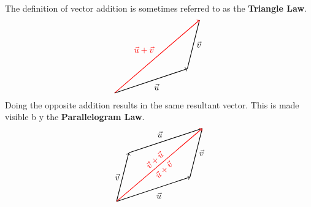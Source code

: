 \documentclass[../Calculus_\Roman{3}]{subfiles}
\begin{document}
				The definition of vector addition is sometimes referred to as the \textbf{Triangle Law}.
				\[\begin{tikzpicture}
					\draw[thick, ->] (0, 0) -- node[anchor = north west]{$\vec{u}$} ++ (3, 1);
					\draw[thick] (3, 1) -- node[anchor = west]{$\vec{v}$} ++ (0.5, 2);
					\draw[thick, ->, color = red] (0, 0) -- node[anchor = south east]{$\vec{u} + \vec{v}$} ++ (3.5, 3); 
				\end{tikzpicture}\]
				Doing the opposite addition results in the same resultant vector. This is made visible b y the \textbf{Parallelogram Law}.
				\[\begin{tikzpicture}
					\draw[thick, ->] (0, 0) -- node[anchor = north west]{$\vec{u}$} ++ (3, 1);
					\draw[thick] (3, 1) -- node[anchor = west]{$\vec{v}$} ++ (0.5, 2);
					\draw[thick, ->] (0, 0) -- node[anchor = east]{$\vec{v}$} (0.5, 2);
					\draw[thick] (0.5, 2) -- node[anchor = south east]{$\vec{u}$} ++ (3, 1);
					\draw[thick, ->, color = red] (0, 0) -- node[anchor = south, rotate = 43]{$\vec{v} + \vec{u}$} node[anchor = north, rotate = 43]{$\vec{u} + \vec{v}$} ++ (3.5, 3);
				\end{tikzpicture}\]
\end{document}
